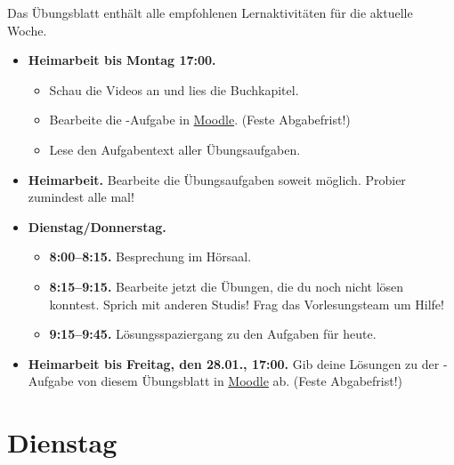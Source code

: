 \documentclass{uebung_cs}
\begin{document}
Das Übungsblatt enthält alle empfohlenen Lernaktivitäten für die aktuelle Woche.

\begin{itemize}
\item \textbf{Heimarbeit bis Montag 17:00.}
    \begin{itemize}
    \item 
    Schau die Videos an und lies die Buchkapitel.
    \item Bearbeite die -Aufgabe in \href{https://moodle.studiumdigitale.uni-frankfurt.de/moodle/course/view.php?id=2241}{Moodle}. (Feste Abgabefrist!)
    \item Lese den Aufgabentext aller Übungsaufgaben.
    \end{itemize}
\item \textbf{Heimarbeit.} Bearbeite die Übungsaufgaben soweit möglich. Probier zumindest alle mal!
\item \textbf{Dienstag/Donnerstag.}
\begin{itemize}
    \item \textbf{8:00--8:15.} Besprechung im Hörsaal.
    \item \textbf{8:15--9:15.} Bearbeite jetzt die Übungen, die du noch nicht lösen konntest. Sprich mit anderen Studis! Frag das Vorlesungsteam um Hilfe!
    \item \textbf{9:15--9:45.} Lösungsspaziergang zu den Aufgaben für heute.
\end{itemize}

\item \textbf{Heimarbeit bis Freitag, den 28.01., 17:00.} Gib deine Lösungen zu der -Aufgabe von diesem Übungsblatt in \href{https://moodle.studiumdigitale.uni-frankfurt.de/moodle/course/view.php?id=2241}{Moodle} ab. (Feste Abgabefrist!)
\end{itemize}

\section*{Dienstag}
\end{document}
